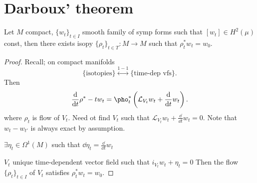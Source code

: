 \section{Darboux' theorem} \label{sec:darboux'_theorem}
\begin{theorem}
	[Moser's]
	Let $M$ compact, $\{w_t\} _{t \in I}$ smooth family of symp forms such that $[w_t] \in H^2(\mu)$ const, then there exists isopy $\{\rho_t\} _{t \in T}: M \to M$ such that $\rho_t^*w_t = w_0$.	
\end{theorem}
\begin{proof}
	Recall; on compact manifolds 
	\[
		\{\text{isotopies}\}  \overset{1-1}{\longleftrightarrow} \{\text{time-dep vfs}\}	
	.\] 
	Then 
	\begin{align*}
		\frac{\dd }{\dd t} \rho^*-t w_t = \pho^*_t\left( \mathcal{L} _{V_t}w_t + \frac{\dd}{ \dd t}w_t \right) 
	.\end{align*}
	where $\rho_t$ is flow of $V_t$. Need ot find $V_t$ such that $\mathcal{L} _{V_t}w_t + \frac{\dd}{ \dd t}w_t = 0$. 
	Note that $w_t - w_{t'}$ is always exact by assumption. 
	\begin{fact}
		$\exists \eta_t \in \Omega^1(M)$ such that $\dd \eta_t =\frac{\dd }{\dd t } w_t$ 
	\end{fact}
	$V_t$ unique time-dependent vector field such that $i_{V_t}w_t + \eta_t = 0$
Then the flow $\{\rho_t\} _{t \in I}$ of $V_t$ satisfies $\rho^*_tw_t = w_0$. 
\end{proof}
